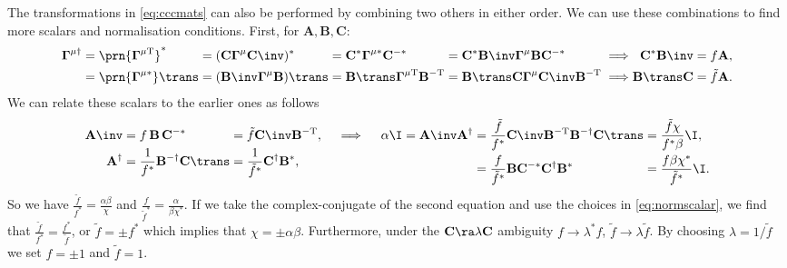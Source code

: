 \documentclass[11pt]{article}
\newcommand{\invd}{^{-\dag}}
\newcommand{\invt}{^{-\mathrm{T}}}
\newcommand{\invc}{^{-\ast}}
\newcommand{\Gammab}{\boldsymbol{\Gamma}}
\newcommand{\Gammap}[1][\mu]{\prn{\Gammab^{#1}}}
\newcommand{\mud}{{\mu\dag}}
\newcommand{\mut}{{\mu\mathrm{T}}}
\newcommand{\muc}{{\mu\ast}}
\newcommand{\A}{\mathbf{A}}
\newcommand{\B}{\mathbf{B}}
\renewcommand{\C}{\mathbf{C}}
\begin{document}
The transformations in \cref{eq:cccmats} can also be performed by combining two others in either order.
We can use these combinations to find more scalars and normalisation conditions.
First, for $\A,\B,\C$:
%
\begin{equation*}
\begin{alignedat}{6}
  \Gammab^\mud &= \Gammap[\mut]^\ast &
    &= (\C \Gammab^\mu \C\inv)^\ast &
    &= \C^\ast \Gammab^\muc \C\invc &
    &= \C^\ast \B\inv \Gammab^\mu \B \C\invc &
    &\implies &
  \C^\ast \B\inv &= f \A, \\
    &= \Gammap[\muc]\trans &
    &= (\B\inv \Gammab^\mu \B)\trans &
    &= \B\trans \Gammab^\mut \B\invt &
    &= \B\trans \C \Gammab^\mu \C\inv \B\invt &
    &\implies &
  \B\trans \C &= \tilde{f} \A. \\
\end{alignedat}
\end{equation*}
%
We can relate these scalars to the earlier ones as follows
%
\begin{equation*}
\begin{alignedat}[t]{2}
  \A\inv &= f \, \B \, \C\invc &
    &= \tilde{f} \C\inv \B\invt, \\
  \A^\dag &= \frac{1}{f^\ast} \B\invd \C\trans &
    &= \frac{1}{\tilde{f}^\ast} \C^\dag \B^\ast,
\end{alignedat}
   \quad\implies\quad
\begin{alignedat}[t]{3}
  \alpha \I &= \A\inv \A^\dag &
    &= \frac{\tilde{f}}{f^\ast} \C\inv \B\invt \B\invd \C\trans &
      &= \frac{\tilde{f} \chi}{f^\ast \beta} \I, \\ &&
    &= \frac{f}{\tilde{f}^\ast} \B \C\invc \C^\dag \B^\ast &
      &= \frac{f \beta \chi^\ast}{\tilde{f}^\ast} \I.
\end{alignedat}
\end{equation*}
%
So we have \( \frac{\tilde{f}}{f^\ast} = \frac{\alpha \beta}{\chi} \)
and \( \frac{f}{\tilde{f}^\ast} = \frac{\alpha}{\beta \chi^\ast} \).
If we take the complex-conjugate of the second equation and use the choices in \cref{eq:normscalar},
we find that \( \frac{\tilde{f}}{f^\ast} = \frac{f^\ast}{\tilde{f}} \),
or \( \tilde{f} = \pm f^\ast \) which implies that $\chi = \pm \alpha \beta$.
Furthermore, under the $\C \ra \lambda \C$ ambiguity \( f \rightarrow \lambda^\ast f\),
\(\tilde{f} \rightarrow \lambda \tilde{f} \).
By choosing $\lambda = 1/\tilde{f}$ we set $f = \pm1$ and $\tilde{f} = 1$.
\end{document}
